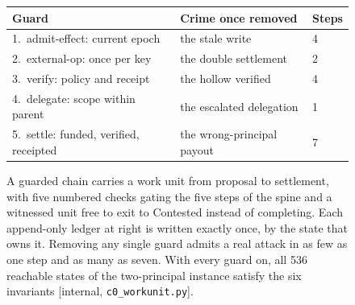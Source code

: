 \begin{figure}[H]

\vspace{2pt}
\footnotesize
\begin{tabular}{@{}lll@{}}
\toprule
Guard & Crime once removed & Steps \\
\midrule
1.\ admit-effect: current epoch & the stale write & 4 \\
2.\ external-op: once per key & the double settlement & 2 \\
3.\ verify: policy and receipt & the hollow verified & 4 \\
4.\ delegate: scope within parent & the escalated delegation & 1 \\
5.\ settle: funded, verified, receipted & the wrong-principal payout & 7 \\
\bottomrule
\end{tabular}

\caption{A guarded chain carries a work unit from proposal to settlement, with
five numbered checks gating the five steps of the spine and a witnessed unit
free to exit to Contested instead of completing. Each append-only ledger at
right is written exactly once, by the state that owns it. Removing any single
guard admits a real attack in as few as one step and as many as seven. With
every guard on, all 536 reachable states of the two-principal instance satisfy
the six invariants [internal, \texttt{c0\_workunit.py}].}
\label{fig:swk-workunit-machine}
\end{figure}

